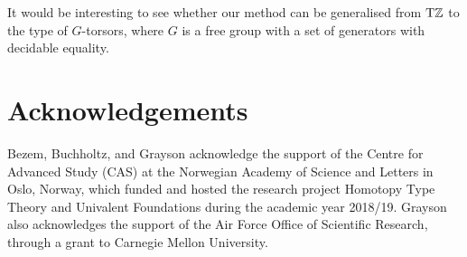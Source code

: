 \documentclass[a4paper,12pt]{amsart}
\begin{document}
It would be interesting to see whether our method can be generalised
from ${\mathrm{T}\mathbb{Z}}$ to the type of $G$-torsors, where $G$ is a free group with
a set of generators with decidable equality.

\section{Acknowledgements}
Bezem, Buchholtz, and Grayson acknowledge the support of the Centre for Advanced Study (CAS)
at the Norwegian Academy of Science and Letters
in Oslo, Norway, which funded and hosted the research project Homotopy Type Theory and Univalent Foundations during the academic year 2018/19.
Grayson also acknowledges the support of the Air Force Office of Scientific Research, through a grant to Carnegie Mellon University.

\raggedright
\printbibliography
\end{document}
